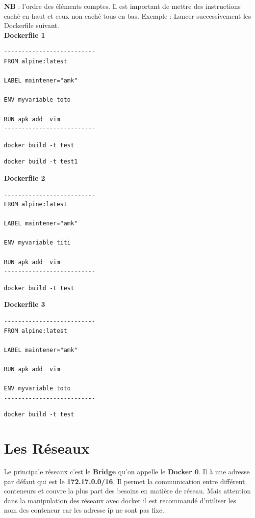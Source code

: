\documentclass[12pt,a4paper]{article}
\begin{document}
\textbf{NB } : l'ordre des éléments comptes. Il est important de mettre des instructions
caché en haut et ceux non caché tous en bas.
Exemple : Lancer successivement les Dockerfile suivant.\\
\textbf{Dockerfile 1}
\begin{verbatim}
--------------------------
FROM alpine:latest

LABEL maintener="amk"

ENV myvariable toto

RUN apk add  vim
--------------------------
\end{verbatim} 
\begin{verbatim}
docker build -t test
\end{verbatim}
\begin{verbatim}
docker build -t test1
\end{verbatim}
\textbf{Dockerfile 2}
\begin{verbatim}
--------------------------
FROM alpine:latest

LABEL maintener="amk"

ENV myvariable titi

RUN apk add  vim
--------------------------
\end{verbatim} 
\begin{verbatim}
docker build -t test
\end{verbatim}
\textbf{Dockerfile 3}
\begin{verbatim}
--------------------------
FROM alpine:latest

LABEL maintener="amk"

RUN apk add  vim

ENV myvariable toto
--------------------------
\end{verbatim} 
\begin{verbatim}
docker build -t test
\end{verbatim}

\section{Les Réseaux}
Le principale réseaux c'est le \textbf{Bridge} qu'on appelle le \textbf{Docker 0}.
Il à une adresse par défaut qui est le
\textbf{172.17.0.0/16}. Il permet la communication entre différent conteneurs et couvre 
la plus part des besoins en matière de réseau. Mais attention dans la manipulation des 
réseaux avec docker il est recommandé d'utiliser les nom des conteneur car les adresse 
ip ne sont pas fixe.
\end{document}
